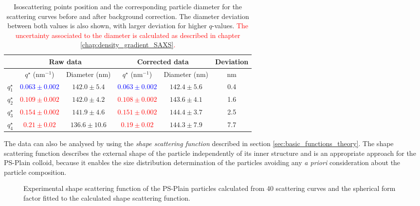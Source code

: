 \begin{table*}
\centering
\begin{tabular}{l||cc|cc|c}
& \multicolumn{2}{c}{Raw data} & \multicolumn{2}{c}{Corrected data} & Deviation\\
\hline
& \( q^{\star} \) (nm\(^{-1}\))    &  Diameter (nm) & \( q^{\star}\) (nm\(^{-1}\))    &  Diameter (nm) & nm \\
\hline
\(q^{\star}_1\) &  \textcolor{blue}{$0.063\pm0.002$} & $142.0\pm5.4$ &  \textcolor{blue}{$0.063\pm0.002$} & $142.4\pm5.6$ & 0.4 \\
\(q^{\star}_2\) &  \textcolor{red}{$0.109\pm0.002$} & $142.0\pm4.2$ &  \textcolor{red}{$0.108\pm0.002$} & $143.6\pm4.1$ & 1.6   \\
\(q^{\star}_3\) &  \textcolor{red}{$0.154\pm0.002$} & $141.9\pm4.6$ &  \textcolor{red}{$0.151\pm0.002$} & $144.4\pm3.7$ & 2.5    \\
\(q^{\star}_4\) &  \textcolor{red}{$0.21\pm0.02$}  & $136.6\pm10.6$ &  \textcolor{red}{$0.19\pm0.02$}  & $144.3\pm7.9$ & 7.7     \\
\end{tabular}
\caption[Isoscattering points position and their corresponding particle diameter.]{Isoscattering points position and the corresponding particle diameter for the scattering curves before and after background correction. The diameter deviation between both values is also shown, with larger deviation for higher $q$-values. \textcolor{red}{The uncertainty associated to the diameter is calculated as described in chapter \ref{chap:density_gradient_SAXS}.}}
\label{tab:isoscattering_points}
\end{table*}

The data can also be analysed by using the \emph{shape scattering function} described in section \ref{sec:basic_functions_theory}. The shape scattering function describes the external shape of the particle independently of its inner structure and is an appropriate approach for the PS-Plain colloid, because it enables the size distribution determination of the particles avoiding any \emph{a priori} consideration about the particle composition.

\begin{figure}
	\begin{center}
		
	\end{center}
	\caption[Experimental shape scattering function of the PS-Plain particles.]{Experimental shape scattering function of the PS-Plain particles calculated from 40 scattering curves and the spherical form factor fitted to the calculated shape scattering function.}
	\label{fig:PSPlainResonantTerm}
\end{figure}

